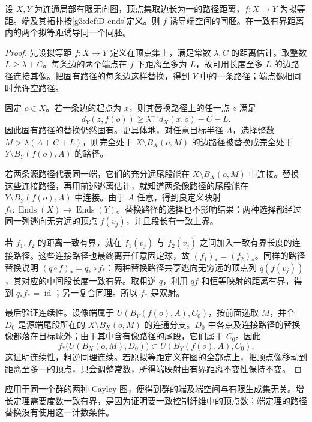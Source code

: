\begin{theorem}\label{g3:thm:D-ends-quasi-isometry}
	设 \(X,Y\) 为连通局部有限无向图，顶点集取边长为一的路径距离，\(f:X\to Y\) 为拟等距。端及其拓扑按\cref{g3:def:D-ends}定义。则 \(f\) 诱导端空间的同胚。在一致有界距离内的两个拟等距诱导同一个同胚。
\end{theorem}
\begin{proof}
	先设拟等距 \(f:X\rightarrow Y\) 定义在顶点集上，满足常数 \(\lambda,C\) 的距离估计。取整数 \(L\ge\lambda+C\)。每条边的两个端点在 \(f\) 下距离至多为 \(L\)，故可用长度至多 \(L\) 的边路径连接其像。把固有路径的每条边这样替换，得到 \(Y\) 中的一条路径；端点像相同时允许空路径。

	固定 \(o\in X\)。若一条边的起点为 \(x\)，则其替换路径上的任一点 \(z\) 满足
	\begin{equation}\label{g3:eq:D-path-escape}
		d_Y(z,f(o))\ge\lambda^{-1}d_X(x,o)-C-L.
	\end{equation}
	因此固有路径的替换仍然固有。更具体地，对任意目标半径 \(A\)，选择整数 \(M>\lambda(A+C+L)\)，则完全处于 \(X\setminus B_X(o,M)\) 的边路径被替换成完全处于 \(Y\setminus B_Y(f(o),A)\) 的路径。

	若两条源路径代表同一端，它们的充分远尾段能在 \(X\setminus B_X(o,M)\) 中连接。替换这些连接路径，再用前述逃离估计，就知道两条像路径的尾段能在 \(Y\setminus B_Y(f(o),A)\) 中连接。由于 \(A\) 任意，得到良定义映射 \(f_*:\operatorname{Ends}(X)\rightarrow\operatorname{Ends}(Y)\)。替换路径的选择也不影响结果：两种选择都经过同一列逃向无穷远的顶点 \(f(v_j)\)，并且段长有一致上界。

	若 \(f_1,f_2\) 的距离一致有界，就在 \(f_1(v_j)\) 与 \(f_2(v_j)\) 之间加入一致有界长度的连接路径。这些连接路径也最终离开任意固定球，故 \((f_1)_*=(f_2)_*\)。同样的路径替换说明 \((q\circ f)_*=q_*\circ f_*\)：两种替换路径共享逃向无穷远的顶点列 \(q(f(v_j))\)，其对应的中间段长度一致有界。取粗逆 \(q\)，利用 \(qf\) 和恒等映射的距离有界，得到 \(q_*f_*=\operatorname{id}\)；另一复合同理。所以 \(f_*\) 是双射。

	最后验证连续性。设像端属于 \(U(B_Y(f(o),A),C_0)\)，按前面选取 \(M\)，并令 \(D_0\) 是源端尾段所在的 \(X\setminus B_X(o,M)\) 的连通分支。\(D_0\) 中各点及连接路径的替换像都落在目标球外；由于其中含有像路径的尾段，它们属于 \(C_0\)。因此
	\[
		f_*\bigl(U(B_X(o,M),D_0)\bigr)\subset U(B_Y(f(o),A),C_0).
	\]
	这证明连续性，粗逆同理连续。若原拟等距定义在图的全部点上，把顶点像移动到距离至多一的顶点，只会调整常数，所得端映射由有界距离不变性保持不变。
\end{proof}

应用于同一个群的两种 Cayley 图，便得到群的端及端空间与有限生成集无关。增长定理需要度数一致有界，是因为证明要一致控制纤维中的顶点数；端定理的路径替换没有使用这一计数条件。

